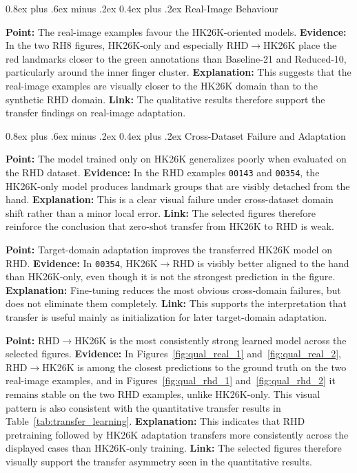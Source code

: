 \documentclass[10pt,letterpaper]{article}
\makeatletter
\renewcommand\subsubsection{\@startsection{subsubsection}{3}{\z@}%
  {0.8ex plus .6ex minus .2ex}%
  {0.4ex plus .2ex}%
  {\normalfont\small\itshape}}
\makeatother
\begin{document}
\subsubsection{Real-Image Behaviour}

\medskip
\noindent\textbf{Point:} The real-image examples favour the HK26K-oriented models.  
\textbf{Evidence:} In the two RH8 figures, HK26K-only and especially RHD$\rightarrow$HK26K place the red landmarks closer to the green annotations than Baseline-21 and Reduced-10, particularly around the inner finger cluster.  
\textbf{Explanation:} This suggests that the real-image examples are visually closer to the HK26K domain than to the synthetic RHD domain.  
\textbf{Link:} The qualitative results therefore support the transfer findings on real-image adaptation.

\subsubsection{Cross-Dataset Failure and Adaptation}

\medskip
\noindent\textbf{Point:} The model trained only on HK26K generalizes poorly when evaluated on the RHD dataset.  
\textbf{Evidence:} In the RHD examples \texttt{00143} and \texttt{00354}, the HK26K-only model produces landmark groups that are visibly detached from the hand.  
\textbf{Explanation:} This is a clear visual failure under cross-dataset domain shift rather than a minor local error.  
\textbf{Link:} The selected figures therefore reinforce the conclusion that zero-shot transfer from HK26K to RHD is weak.

\medskip
\noindent\textbf{Point:} Target-domain adaptation improves the transferred HK26K model on RHD.  
\textbf{Evidence:} In \texttt{00354}, HK26K$\rightarrow$RHD is visibly better aligned to the hand than HK26K-only, even though it is not the strongest prediction in the figure.  
\textbf{Explanation:} Fine-tuning reduces the most obvious cross-domain failures, but does not eliminate them completely.  
\textbf{Link:} This supports the interpretation that transfer is useful mainly as initialization for later target-domain adaptation.

\medskip
\noindent\textbf{Point:} RHD$\rightarrow$HK26K is the most consistently strong learned model across the selected figures.  
\textbf{Evidence:} In Figures~\ref{fig:qual_real_1} and~\ref{fig:qual_real_2}, RHD$\rightarrow$HK26K is among the closest predictions to the ground truth on the two real-image examples, and in Figures~\ref{fig:qual_rhd_1} and~\ref{fig:qual_rhd_2} it remains stable on the two RHD examples, unlike HK26K-only. This visual pattern is also consistent with the quantitative transfer results in Table~\ref{tab:transfer_learning}.  
\textbf{Explanation:} This indicates that RHD pretraining followed by HK26K adaptation transfers more consistently across the displayed cases than HK26K-only training.  
\textbf{Link:} The selected figures therefore visually support the transfer asymmetry seen in the quantitative results.
\end{document}
